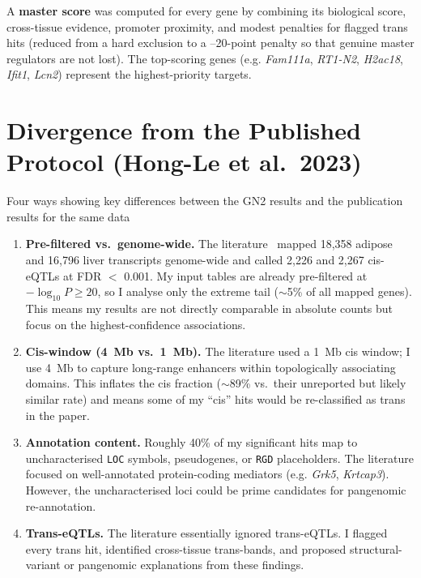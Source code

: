 \documentclass[11pt,a4paper]{article}
\begin{document}
\noindent A \textbf{master score} was computed for every gene by combining its biological score, cross-tissue evidence, promoter proximity, and modest penalties for flagged trans hits (reduced from a hard exclusion to a --20-point penalty so that genuine master regulators are not lost). The top-scoring genes (e.g. \textit{Fam111a}, \textit{RT1-N2}, \textit{H2ac18}, \textit{Ifit1}, \textit{Lcn2}) represent the highest-priority targets.

\section{Divergence from the Published Protocol (Hong-Le et al.~2023)}

Four ways showing key differences between the GN2 results and the publication results for the same data 

\begin{enumerate}
    \item \textbf{Pre-filtered vs.~genome-wide.} The literature~\cite{hongle2023} mapped 18,358 adipose and 16,796 liver transcripts genome-wide and called 2,226 and 2,267 cis-eQTLs at FDR $<$ 0.001. My input tables are already pre-filtered at $-\log_{10}P \geq 20$, so I analyse only the extreme tail ($\sim$5\% of all mapped genes). This means my results are not directly comparable in absolute counts but focus on the highest-confidence associations.
    
    \item \textbf{Cis-window (4~Mb vs.~1~Mb).} The literature used a 1~Mb cis window; I use 4~Mb to capture long-range enhancers within topologically associating domains. This inflates the cis fraction ($\sim$89\% vs.~their unreported but likely similar rate) and means some of my ``cis'' hits would be re-classified as trans in the paper.
    
    \item \textbf{Annotation content.} Roughly 40\% of my significant hits map to uncharacterised \texttt{LOC} symbols, pseudogenes, or \texttt{RGD} placeholders. The literature focused on well-annotated protein-coding mediators (e.g. \textit{Grk5}, \textit{Krtcap3}). However, the uncharacterised loci could be prime candidates for pangenomic re-annotation.
    
    \item \textbf{Trans-eQTLs.} The literature essentially ignored trans-eQTLs. I flagged every trans hit, identified cross-tissue trans-bands, and proposed structural-variant or pangenomic explanations from these findings.
\end{enumerate}
\end{document}
